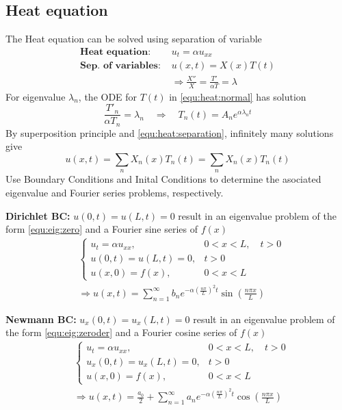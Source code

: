 \documentclass[10pt,leqno]{article}
\begin{document}
\begin{multicols}{2}
\subsection*{Heat equation}

The Heat equation can be solved using separation of variable
\begin{align}
    \textbf{Heat equation:\ }& u_{t}=\alpha u_{xx} \\
    \textbf{Sep. of variables:\ }& u(x,t)=X(x)T(t) \label{equ:heat:separation} \\
    & \Rightarrow \frac{X''}{X} = \frac{T'}{\alpha T} = \lambda \label{equ:heat:normal}
\end{align}
For eigenvalue $\lambda_{n}$, the ODE for $T(t)$ in \eqref{equ:heat:normal} has solution
\begin{equation}
\frac{T'_{n}}{\alpha T_{n}} = \lambda_{n} \quad \Rightarrow \quad T_{n}(t)=A_{n}e^{\alpha\lambda_{n}t}
\end{equation}
By superposition principle and \eqref{equ:heat:separation}, infinitely many solutions give
\begin{equation}
u(x,t)=\sum_{n} X_{n}(x)T_{n}(t) = \sum_{n} X_{n}(x)T_{n}(t)
\end{equation}
Use Boundary Conditions and Inital Conditions to determine the asociated eigenvalue and Fourier series problems, respectively.

\textbf{Dirichlet BC:} $u(0,t) = u(L,t)= 0$ result in an eigenvalue pro\-blem of the form \eqref{equ:eig:zero} and a Fourier sine series of $f(x)$
\begin{align}
    & \left\{ \begin{array}{ll}
            u_{t} = \alpha u_{xx}, & 0<x<L, \quad t>0 \\
            u(0,t) = u(L,t)= 0, & t>0 \\
            u(x,0) = f(x), & 0<x<L
    \end{array}\right. \label{equ:heat:dirichlet} \\
    & \Rightarrow u(x,t)=\sum_{n=1}^{\infty}b_{n}e^{-\alpha \left(\frac{n \pi}{L}\right)^{2}t}\sin\left(\frac{n\pi x}{L}\right)
\end{align}

\textbf{Newmann BC:} $u_{x}(0,t) = u_{x}(L,t)= 0$ result in an eigenvalue problem of the form \eqref{equ:eig:zeroder} and a Fourier cosine series of $f(x)$
\begin{align}
    & \left\{ \begin{array}{ll}
            u_{t} = \alpha u_{xx}, & 0<x<L, \quad t>0 \\
            u_{x}(0,t) = u_{x}(L,t)= 0, & t>0 \\
            u(x,0) = f(x), & 0<x<L
    \end{array}\right. \label{equ:heat:neuman}\\
    & \Rightarrow u(x,t)= \frac{a_{0}}{2}+\sum_{n=1}^{\infty}a_{n}e^{-\alpha \left(\frac{n \pi}{L}\right)^{2}t}\cos\left(\frac{n\pi x}{L}\right)
\end{align}


\end{multicols}
\end{document}
